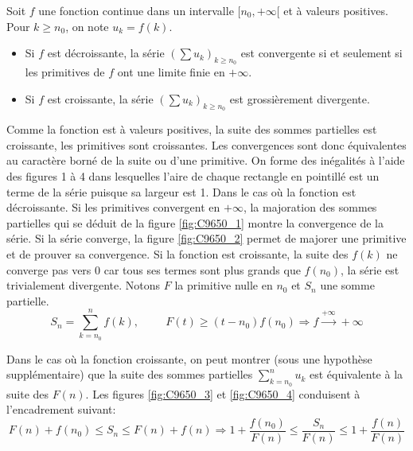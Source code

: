 \begin{prop}
  Soit $f$ une fonction continue dans un intervalle $[n_0,+\infty[$ et à valeurs positives. Pour $k\geq n_0$, on note $u_k=f(k)$.
\begin{itemize}
  \item Si $f$ est décroissante, la série $\left( \sum u_k \right)_{k\geq n_0}$ est convergente si et seulement si les primitives de $f$ ont une limite finie en $+\infty$.
  \item Si $f$ est croissante, la série $\left( \sum u_k \right)_{k\geq n_0}$ est grossièrement divergente.
\end{itemize}
\end{prop}
\begin{demo}
Comme la fonction est à valeurs positives, la suite des sommes partielles est croissante, les primitives sont croissantes. Les convergences sont donc équivalentes au caractère borné de la suite ou d'une primitive. On forme des inégalités à l'aide des figures 1 à 4 dans lesquelles l'aire de chaque rectangle en pointillé est un terme de la série puisque sa largeur est 1.\newline
Dans le cas où la fonction est décroissante.\newline
Si les primitives convergent en $+\infty$, la majoration des sommes partielles qui se déduit de la figure \ref{fig:C9650_1} montre la convergence de la série. Si la série converge, la figure \ref{fig:C9650_2} permet de majorer une primitive et de prouver sa convergence.\newline
Si la fonction est croissante, la suite des $f(k)$ ne converge pas vers $0$ car tous ses termes sont plus grands que $f(n_0)$, la série est trivialement divergente. Notons $F$ la primitive nulle en $n_0$ et $S_n$ une somme partielle.
\begin{displaymath}
 S_n = \sum_{k=n_0}^{n}f(k),\hspace{1cm} F(t) \geq (t-n_0)f(n_0) \Rightarrow f \xrightarrow{+\infty} +\infty
\end{displaymath}
\end{demo}
Dans le cas où la fonction croissante, on peut montrer (sous une hypothèse supplémentaire) que la suite des sommes partielles $\sum_{k=n_0}^n u_k$ est équivalente à la suite des $F(n)$. Les figures \ref{fig:C9650_3} et \ref{fig:C9650_4} conduisent à l'encadrement suivant:
\begin{displaymath}
F(n) + f(n_0) \leq S_n \leq F(n) +f(n) \Rightarrow 1 + \frac{f(n_0)}{F(n)} \leq \frac{S_n}{F(n)} \leq 1 + \frac{f(n)}{F(n)}
\end{displaymath}
